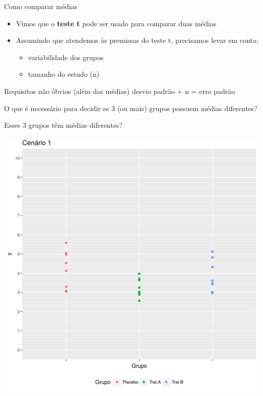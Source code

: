 \documentclass{beamer}
\begin{document}
\begin{frame}{Como comparar médias}
  \begin{itemize}
  \item Vimos que o {\bf teste t} pode ser usado para comparar duas médias
  \item Assumindo que atendemos às premissas do teste t, precisamos levar em conta:
    \begin{itemize}
    \item variabilidade dos grupos
    \item tamanho do estudo (n)
    \end{itemize}
  \end{itemize}
  \begin{block}{Requisitos não óbvios (além das médias)}
    desvio padrão + n = erro padrão
  \end{block}
\end{frame}

\begin{frame}
  \begin{block}{}
    O que é necessário para decidir se 3 (ou mais) grupos possuem médias diferentes?
  \end{block}
\end{frame}

\begin{frame}{Esses 3 grupos têm médias diferentes?}
  \begin{center}
    \includegraphics[height=.9\textheight]{Topicos_adv/cenario1}
  \end{center}
\end{frame}
\end{document}
